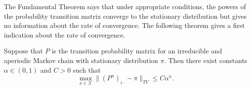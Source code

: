 \documentclass[12pt]{article}
\begin{document}
\begin{remark}
    The Fundamental Theorem says that under appropriate conditions, the
    powers of the probability transition matrix converge to the
    stationary distribution but gives no information about the rate of
    convergence.  The following theorem gives a first indication about
    the rate of convergence.
\end{remark}

\begin{theorem}
    Suppose that \( P \) is the transition probability matrix for an
    irreducible and aperiodic Markov chain with stationary distribution \(
    \pi \).  Then there exist constants \( \alpha \in (0,1) \) and \( C
    > 0 \) such that
    \[
        \max_{x \in \mathcal{X}} \| (P^n)_{i \cdot} - \pi \|_{TV} \le C
        \alpha^n.
    \]
\end{theorem}
\end{document}
